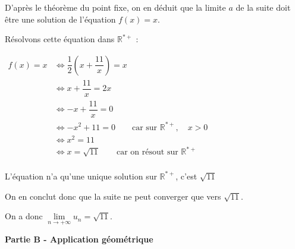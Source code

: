 \documentclass[10pt]{article}
\providecommand{\R}{\mathbb{R}}
\begin{document}
\begin{enumerate}
D'après le théorème du point fixe, on en déduit que la limite $a$ de la suite doit être une solution de l'équation $f(x) = x$.

Résolvons cette équation dans $\R^{*+}$ :

$\begin{aligned}  f(x) = x &\iff \dfrac{1}{2}\left(x + \dfrac{11}{x}\right) = x\\
&\iff x+ \dfrac{11}{x} = 2x\\
&\iff -x + \dfrac{11}{x} = 0\\
&\iff -x^2 + 11 = 0 \qquad \text{car sur }\R^{*+}, \quad x>0\\
&\iff x^2 = 11\\
&\iff x = \sqrt{11} \qquad \text{car on résout sur }\R^{*+}		\\ \end{aligned}$

L'équation n'a qu'une unique solution sur $\R^{*+}$, c'est $\sqrt{11}$

On en conclut donc que la suite ne peut converger que vers $\sqrt{11}$.

On a donc $\lim\limits_{n \to +\infty} u_n = \sqrt{11}$.
\end{enumerate}

\medskip

\textbf{Partie B - Application géométrique}

\medskip
\end{document}
